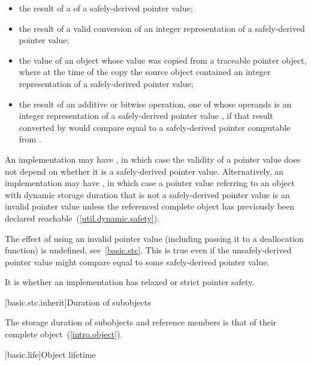 \begin{itemize}
\item the result of a  of a safely-derived pointer value;

\item the result of a valid conversion of an integer representation of a safely-derived
pointer value;

\item the value of an object whose value was copied from a traceable pointer object,
where at the time of the copy the source object contained an integer representation of a
safely-derived pointer value;

\item the result of an additive or bitwise operation, one of whose operands is an
integer representation of a safely-derived pointer value , if that result
converted by  would compare equal to a safely-derived
pointer computable from .
\end{itemize}

\pnum
An implementation may have , in which case the
validity of a pointer value does not depend on whether it is a safely-derived
pointer value. Alternatively, an implementation may have , in which case a pointer value referring to an object with dynamic
storage duration that is not a safely-derived pointer
value is an invalid pointer value unless
the referenced complete object has previously been declared
reachable~(\ref{util.dynamic.safety}). \begin{note}
The effect of using an invalid pointer value (including passing it to a
deallocation function) is undefined, see~\ref{basic.stc}.
This is true even if the unsafely-derived pointer value might compare equal to
some safely-derived pointer value. \end{note} It is
 whether an implementation has relaxed or strict pointer safety.%
%

[basic.stc.inherit]{Duration of subobjects}

\pnum
{}%
The storage duration of subobjects and reference members
is that of their complete object~(\ref{intro.object}).
%

[basic.life]{Object lifetime}

